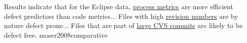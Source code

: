 \documentclass{article}
\begin{document}
  {Results indicate that for the Eclipse data, \ul{process metrics} are more efficient defect predictors than code metrics... Files with high \ul{revision numbers} are by nature defect prone... Files that are part of \ul{large CVS commits} are likely to be defect free.}
  {moser2008comparative}
\end{document}

